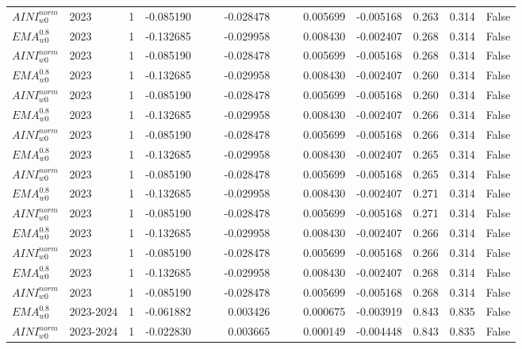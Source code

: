 \begin{tabular}{@{}llrrrrrrrrrlll@{}}
$AINI^{norm}_{w0}$ & 2023 & 1 & -0.085190 &  &  & -0.028478 &  &  & 0.005699 & -0.005168 & 0.263 & 0.314 & False \\
$EMA^{0.8}_{w0}$ & 2023 & 1 & -0.132685 &  &  & -0.029958 &  &  & 0.008430 & -0.002407 & 0.268 & 0.314 & False \\
$AINI^{norm}_{w0}$ & 2023 & 1 & -0.085190 &  &  & -0.028478 &  &  & 0.005699 & -0.005168 & 0.268 & 0.314 & False \\
$EMA^{0.8}_{w0}$ & 2023 & 1 & -0.132685 &  &  & -0.029958 &  &  & 0.008430 & -0.002407 & 0.260 & 0.314 & False \\
$AINI^{norm}_{w0}$ & 2023 & 1 & -0.085190 &  &  & -0.028478 &  &  & 0.005699 & -0.005168 & 0.260 & 0.314 & False \\
$EMA^{0.8}_{w0}$ & 2023 & 1 & -0.132685 &  &  & -0.029958 &  &  & 0.008430 & -0.002407 & 0.266 & 0.314 & False \\
$AINI^{norm}_{w0}$ & 2023 & 1 & -0.085190 &  &  & -0.028478 &  &  & 0.005699 & -0.005168 & 0.266 & 0.314 & False \\
$EMA^{0.8}_{w0}$ & 2023 & 1 & -0.132685 &  &  & -0.029958 &  &  & 0.008430 & -0.002407 & 0.265 & 0.314 & False \\
$AINI^{norm}_{w0}$ & 2023 & 1 & -0.085190 &  &  & -0.028478 &  &  & 0.005699 & -0.005168 & 0.265 & 0.314 & False \\
$EMA^{0.8}_{w0}$ & 2023 & 1 & -0.132685 &  &  & -0.029958 &  &  & 0.008430 & -0.002407 & 0.271 & 0.314 & False \\
$AINI^{norm}_{w0}$ & 2023 & 1 & -0.085190 &  &  & -0.028478 &  &  & 0.005699 & -0.005168 & 0.271 & 0.314 & False \\
$EMA^{0.8}_{w0}$ & 2023 & 1 & -0.132685 &  &  & -0.029958 &  &  & 0.008430 & -0.002407 & 0.266 & 0.314 & False \\
$AINI^{norm}_{w0}$ & 2023 & 1 & -0.085190 &  &  & -0.028478 &  &  & 0.005699 & -0.005168 & 0.266 & 0.314 & False \\
$EMA^{0.8}_{w0}$ & 2023 & 1 & -0.132685 &  &  & -0.029958 &  &  & 0.008430 & -0.002407 & 0.268 & 0.314 & False \\
$AINI^{norm}_{w0}$ & 2023 & 1 & -0.085190 &  &  & -0.028478 &  &  & 0.005699 & -0.005168 & 0.268 & 0.314 & False \\
$EMA^{0.8}_{w0}$ & 2023-2024 & 1 & -0.061882 &  &  & 0.003426 &  &  & 0.000675 & -0.003919 & 0.843 & 0.835 & False \\
$AINI^{norm}_{w0}$ & 2023-2024 & 1 & -0.022830 &  &  & 0.003665 &  &  & 0.000149 & -0.004448 & 0.843 & 0.835 & False \\

\end{tabular}
